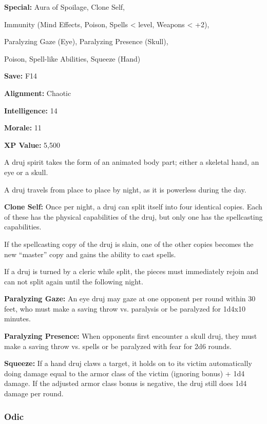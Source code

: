 \begin{multicols*}{2}
{\textbf{Special:} Aura of Spoilage, Clone Self, 

Immunity (Mind Effects, Poison, Spells <  level, Weapons < +2), 

Paralyzing Gaze (Eye), Paralyzing Presence (Skull), 

Poison, Spell-like Abilities, Squeeze (Hand)

\textbf{Save:} F14

\textbf{Alignment:} Chaotic

\textbf{Intelligence:} 14

\textbf{Morale:} 11

\textbf{XP Value:} 5,500}

A druj spirit takes the form of an animated body part; either a skeletal hand, an eye or a skull.

A druj travels from place to place by night, as it is powerless during the day.

\textbf{Clone Self:} Once per night, a druj can split itself into four identical copies. Each of these has the physical capabilities of the druj, but only one has the spellcasting capabilities.

If the spellcasting copy of the druj is slain, one of the other copies becomes the new “master” copy and gains the ability to cast spells.

If a druj is turned by a cleric while split, the pieces must immediately rejoin and can not split again until the following night.

\textbf{Paralyzing Gaze:} An eye druj may gaze at one opponent per round within 30 feet, who must make a saving throw vs. paralysis or be paralyzed for 1d4x10 minutes.

\textbf{Paralyzing Presence:} When opponents first encounter a skull druj, they must make a saving throw vs. spells or be paralyzed with fear for 2d6 rounds.

\textbf{Squeeze:} If a hand druj claws a target, it holds on to its victim automatically doing damage equal to the armor class of the victim (ignoring  bonus) + 1d4 damage. If the adjusted armor class bonus is negative, the druj still does 1d4 damage per round.

\subsubsection{Odic}
\end{multicols*}
